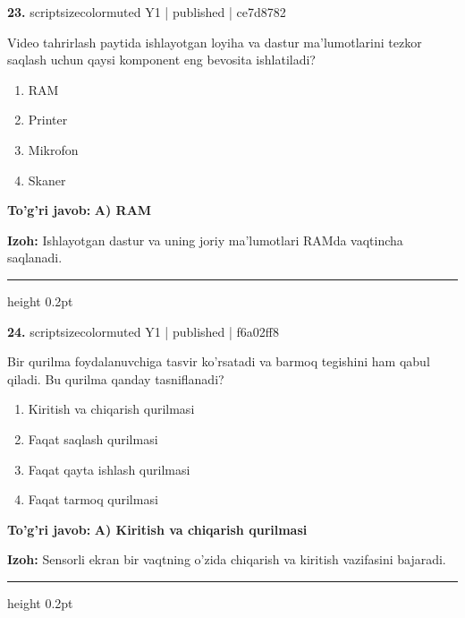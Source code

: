\documentclass[10pt,a4paper]{article}
\begin{document}
{\bfseries\sffamily\color{ink} 23.} {scriptsizecolor{muted} Y1 | published | ce7d8782}
\par
Video tahrirlash paytida ishlayotgan loyiha va dastur ma'lumotlarini tezkor saqlash uchun qaysi komponent eng bevosita ishlatiladi?
\begin{enumerate}[label=\Alph*),leftmargin=9mm]
\item RAM
\item Printer
\item Mikrofon
\item Skaner
\end{enumerate}
\begin{tcolorbox}[enhanced,breakable,colback=teal!4,colframe=teal!60!black,boxrule=0.45pt,arc=1.2mm,left=2.7mm,right=2.7mm,top=1.8mm,bottom=1.8mm,before skip=2mm,after skip=2mm]
{\bfseries\sffamily\color{teal}To'g'ri javob:} \textbf{A) RAM}
\par\smallskip
{\bfseries Izoh:} Ishlayotgan dastur va uning joriy ma'lumotlari RAMda vaqtincha saqlanadi.
\end{tcolorbox}
\vspace{2mm}\hrule height 0.2pt\vspace{3mm}

{\bfseries\sffamily\color{ink} 24.} {scriptsizecolor{muted} Y1 | published | f6a02ff8}
\par
Bir qurilma foydalanuvchiga tasvir ko'rsatadi va barmoq tegishini ham qabul qiladi. Bu qurilma qanday tasniflanadi?
\begin{enumerate}[label=\Alph*),leftmargin=9mm]
\item Kiritish va chiqarish qurilmasi
\item Faqat saqlash qurilmasi
\item Faqat qayta ishlash qurilmasi
\item Faqat tarmoq qurilmasi
\end{enumerate}
\begin{tcolorbox}[enhanced,breakable,colback=teal!4,colframe=teal!60!black,boxrule=0.45pt,arc=1.2mm,left=2.7mm,right=2.7mm,top=1.8mm,bottom=1.8mm,before skip=2mm,after skip=2mm]
{\bfseries\sffamily\color{teal}To'g'ri javob:} \textbf{A) Kiritish va chiqarish qurilmasi}
\par\smallskip
{\bfseries Izoh:} Sensorli ekran bir vaqtning o'zida chiqarish va kiritish vazifasini bajaradi.
\end{tcolorbox}
\vspace{2mm}\hrule height 0.2pt\vspace{3mm}
\end{document}
